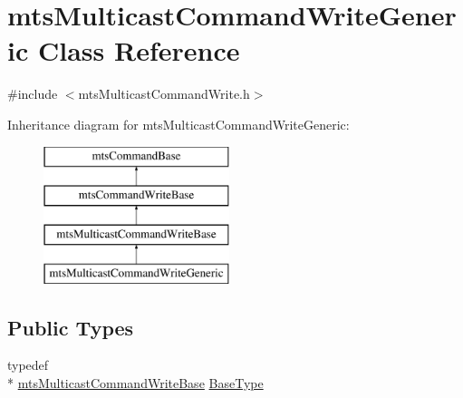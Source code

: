 \hypertarget{classmts_multicast_command_write_generic}{\section{mts\-Multicast\-Command\-Write\-Generic Class Reference}
\label{classmts_multicast_command_write_generic}
}


{\ttfamily \#include $<$mts\-Multicast\-Command\-Write.\-h$>$}

Inheritance diagram for mts\-Multicast\-Command\-Write\-Generic\-:\begin{figure}[H]
\begin{center}
\leavevmode
\includegraphics[height=4.000000cm]{d4/d0a/classmts_multicast_command_write_generic}
\end{center}
\end{figure}
\subsection*{Public Types}
\begin{DoxyCompactItemize}
\item 
typedef \\*
\hyperlink{classmts_multicast_command_write_base}{mts\-Multicast\-Command\-Write\-Base} \hyperlink{classmts_multicast_command_write_generic_ad9b380aee1bd7519d91697092a045bf9}{Base\-Type}
\end{DoxyCompactItemize}
